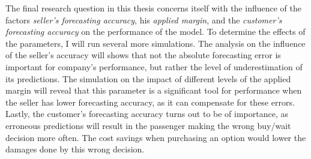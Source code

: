 The final research question in this thesis concerns itself with the influence of the factors \emph{seller's forecasting accuracy}, his \emph{applied margin}, and the \emph{customer's forecasting accuracy} on the performance of the model. To determine the effects of the parameters, I will run several more simulations. The analysis on the influence of the seller's accuracy will shows that not the absolute forecasting error is important for company's performance, but rather the level of underestimation of its predictions. The simulation on the impact of different levels of the applied margin will reveal that this parameter is a significant tool for performance when the seller has lower forecasting accuracy, as it can compensate for these errors. Lastly, the customer's forecasting accuracy turns out to be of importance, as erroneous predictions will result in the passenger making the wrong buy/wait decision more often. The cost savings when purchasing an option would lower the damages done by this wrong decision.